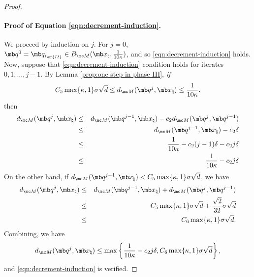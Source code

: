 \begin{proof}
\paragraph{Proof of Equation \eqref{eqn:decrement-induction}.} We proceed by induction on $j$. For $j = 0$, $\mb q^0 = \mb q_{i_{\mr{II}}} \in B_{\mc M}(\mb x_\natural, \tfrac{1}{10\kappa} )$, and so \eqref{eqn:decrement-induction} holds. Now, suppose that \eqref{eqn:decrement-induction} condition holds for iterates $0, 1, \dots, j-1$. By Lemma \ref{prop:one step in phase III}, {\em if} 
\begin{equation}
    C_5 \max\{ \kappa, 1 \} \sigma \sqrt{d} \le d_{\mc M}(\mb q^j, \mb x_\natural ) \le \frac{1}{10\kappa}. 
\end{equation}
then 
\begin{eqnarray}
    d_{\mc M}(\mb q^{j}, \mb x_\natural) &\le& d_{\mc M}(\mb q^{j-1},\mb x_\natural) - c_2 d_{\mc M}(\mb q^j,\mb q^{j-1}) \\ 
    &\le& d_{\mc M}(\mb q^{j-1},\mb x_\natural) - c_2 \delta \\
    &\le& \frac{1}{10\kappa} - c_2 (j-1) \delta - c_2 j \delta \\
    &\le& \frac{1}{10\kappa} - c_2 j \delta
\end{eqnarray}
On the other hand, if $d_{\mc M}(\mb q^{j-1}, \mb x_\natural) < C_5 \max\{ \kappa, 1 \} \sigma \sqrt{d}$, we have 
\begin{eqnarray}
    d_{\mc M}( \mb q^{j}, \mb x_\natural ) &\le&     d_{\mc M}( \mb q^{j-1}, \mb x_\natural ) + d_{\mc M}( \mb q^{j}, \mb q^{j-1} ) \\
    &\le& C_5 \max\{ \kappa, 1 \} \sigma \sqrt{d} + \frac{\sqrt{2}}{32} \sigma \sqrt{d} \\
    &\le& C_6 \max\{ \kappa, 1 \} \sigma \sqrt{d}. 
\end{eqnarray}
Combining, we have 
\begin{equation}
    d_{\mc M}(\mb q^{j}, \mb x_\natural ) \le \max \left\{ \frac{1}{10\kappa} - c_2 j \delta, C_6 \max\{ \kappa, 1 \} \sigma \sqrt{d} \right\},  
\end{equation}
and \eqref{eqn:decrement-induction} is verified. 


\end{proof}
